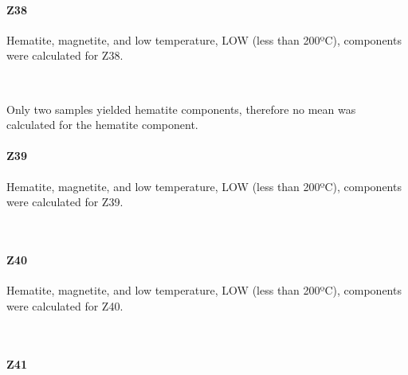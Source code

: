 \documentclass[11pt]{article}
\begin{document}
    \paragraph{Z38}\label{z38}

    Hematite, magnetite, and low temperature, LOW (less than 200ºC),
components were calculated for Z38.



    \begin{center}
    \end{center}
    { \hspace*{\fill} \\}
    
    Only two samples yielded hematite components, therefore no mean was
calculated for the hematite component.

    \paragraph{Z39}\label{z39}

    Hematite, magnetite, and low temperature, LOW (less than 200ºC),
components were calculated for Z39.



    \begin{center}
    \end{center}
    { \hspace*{\fill} \\}
    
    \paragraph{Z40}\label{z40}

    Hematite, magnetite, and low temperature, LOW (less than 200ºC),
components were calculated for Z40.



    \begin{center}
    \end{center}
    { \hspace*{\fill} \\}
    
    \paragraph{Z41}\label{z41}
\end{document}
